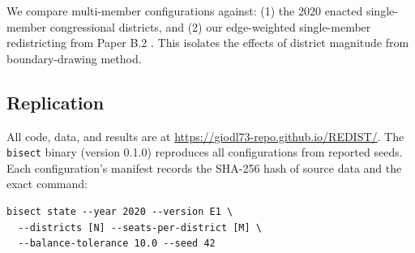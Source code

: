 We compare multi-member configurations against: (1) the 2020 enacted single-member congressional districts, and (2) our edge-weighted single-member redistricting from Paper B.2 \citep{dellib2026edgeweighted}. This isolates the effects of district magnitude from boundary-drawing method.

\subsection{Replication}

All code, data, and results are at \url{https://giodl73-repo.github.io/REDIST/}. The \texttt{bisect} binary (version 0.1.0) reproduces all configurations from reported seeds. Each configuration's manifest records the SHA-256 hash of source data and the exact command:
\begin{verbatim}
bisect state --year 2020 --version E1 \
  --districts [N] --seats-per-district [M] \
  --balance-tolerance 10.0 --seed 42
\end{verbatim}
